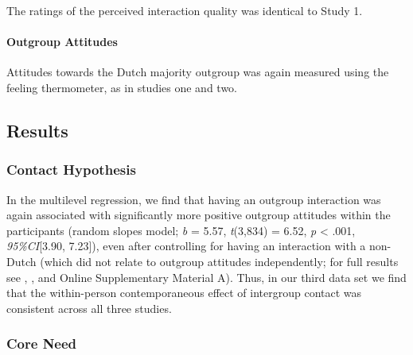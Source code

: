 The ratings of the perceived interaction quality was identical to Study
1.

\paragraph{Outgroup Attitudes}

Attitudes towards the Dutch majority outgroup was again measured using
the feeling thermometer, as in studies one and two.

\subsection{Results}

\subsubsection{Contact Hypothesis}

In the multilevel regression, we find that having an outgroup
interaction was again associated with significantly more positive
outgroup attitudes within the participants (random slopes model;
\textit{b} = 5.57, \textit{t}(3,834) = 6.52, \textit{p} \textless{}
.001, \textit{95\%CI}{[}3.90, 7.23{]}), even after controlling for
having an interaction with a non-Dutch (which did not relate to outgroup
attitudes independently; for full results see
, ,
and Online Supplementary Material A). Thus, in our third data set we
find that the within-person contemporaneous effect of intergroup contact
was consistent across all three studies.

\subsubsection{Core Need}

